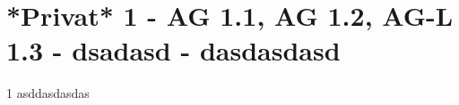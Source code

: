 \section{*Privat* 1 - AG 1.1, AG 1.2, AG-L 1.3 - dsadasd - dasdasdasd}

\begin{langesbeispiel} \item[1] %
asddasdasdas

\end{langesbeispiel}